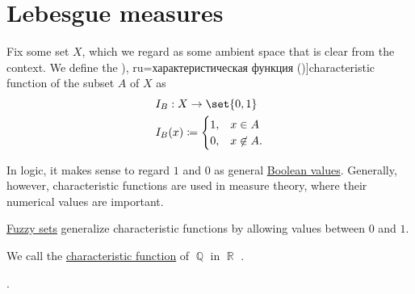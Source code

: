 \section{Lebesgue measures}\label{sec:lebesgue_measures}

\begin{definition}\label{def:subset_characteristic_function}
  Fix some set \( X \), which we regard as some ambient space that is clear from the context. We define the \term[bg=характеристична функция (\cite[exerc. 4.1]{Драганов2022ТеорияНаМярката}), ru=характеристическая функция (\cite[131]{Богачёв2003ОсновыТеорииМерыТом1})]{characteristic function} of the subset \( A \) of \( X \) as
  \begin{equation}\label{eq:def:dirichlet_function}
    \begin{aligned}
      &I_B: X \to \set{ 0, 1 } \\
      &I_B(x) \coloneqq \begin{cases}
        1, &x \in A \\
        0, &x \not\in A.
      \end{cases}
    \end{aligned}
  \end{equation}
\end{definition}
\begin{comments}
  \item In logic, it makes sense to regard \( 1 \) and \( 0 \) as general \hyperref[def:boolean_value]{Boolean values}. Generally, however, characteristic functions are used in measure theory, where their numerical values are important.

  \item \hyperref[def:fuzzy_set]{Fuzzy sets} generalize characteristic functions by allowing values between \( 0 \) and \( 1 \).
\end{comments}

\begin{definition}\label{def:dirichlet_function}
  We call the \hyperref[def:subset_characteristic_function]{characteristic function} of \( \BbbQ \) in \( \BbbR \) .
\end{definition}

\begin{definition}\label{def:lebesgue_measure}
  .
\end{definition}
